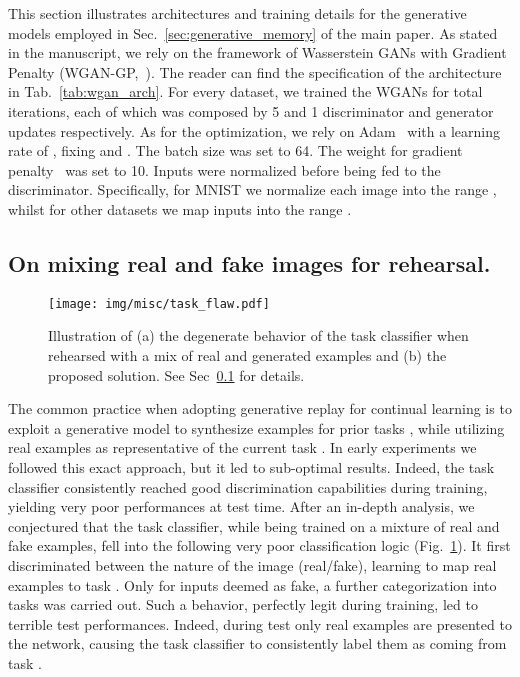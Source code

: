 \documentclass[10pt,twocolumn,letterpaper]{article}
\begin{document}
This section illustrates architectures and training details for the generative models employed in Sec.~\ref{sec:generative_memory} of the main paper. As stated in the manuscript, we rely on the framework of Wasserstein GANs with Gradient Penalty (WGAN-GP,~\cite{wgangp}). The reader can find the specification of the architecture in Tab.~\ref{tab:wgan_arch}. For every dataset, we trained the WGANs for  total iterations, each of which was composed by 5 and 1 discriminator and generator updates respectively. As for the optimization, we rely on Adam~\cite{adam} with a learning rate of , fixing  and . The batch size was set to 64. The weight for gradient penalty~\cite{wgangp} was set to 10. Inputs were normalized before being fed to the discriminator. Specifically, for MNIST we normalize each image into the range , whilst for other datasets we map inputs into the range .
\subsection{On mixing real and fake images for rehearsal.}
\label{sec:task_flaw}
\begin{figure}[b]
\centering
\texttt{[image: img/misc/task\_flaw.pdf]}
\caption{Illustration of (a) the degenerate behavior of the task classifier when rehearsed with a mix of real and generated examples and (b) the proposed solution. See Sec~\ref{sec:task_flaw} for details.}
\label{fig:task_classifier_flaw}
\end{figure} The common practice when adopting generative replay for continual learning is to exploit a generative model to synthesize examples for prior tasks , while utilizing real examples as representative of the current task . 
In early experiments we followed this exact approach, but it led to sub-optimal results.
Indeed, the task classifier consistently reached good discrimination capabilities during training, yielding very poor performances at test time.
After an in-depth analysis, we conjectured that the task classifier, while being trained on a mixture of real and fake examples, fell into the following very poor classification logic (Fig.~\ref{fig:task_classifier_flaw}).
It first discriminated between the nature of the image (real/fake), learning to map real examples to task .
Only for inputs deemed as fake, a further categorization into tasks  was carried out. Such a behavior, perfectly legit during training, led to terrible test performances. 
Indeed, during test only real examples are presented to the network, causing the task classifier to consistently label them as coming from task .
\end{document}
